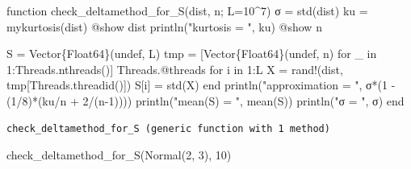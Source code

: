\documentclass[
  letterpaper,
  DIV=11,
  numbers=noendperiod]{scrartcl}
\newenvironment{Shaded}{\begin{snugshade}}{\end{snugshade}}
\newcommand{\BuiltInTok}[1]{\textcolor[rgb]{0.00,0.23,0.31}{#1}}
\newcommand{\ConstantTok}[1]{\textcolor[rgb]{0.56,0.35,0.01}{#1}}
\newcommand{\ControlFlowTok}[1]{\textcolor[rgb]{0.00,0.23,0.31}{#1}}
\newcommand{\DataTypeTok}[1]{\textcolor[rgb]{0.68,0.00,0.00}{#1}}
\newcommand{\FloatTok}[1]{\textcolor[rgb]{0.68,0.00,0.00}{#1}}
\newcommand{\FunctionTok}[1]{\textcolor[rgb]{0.28,0.35,0.67}{#1}}
\newcommand{\KeywordTok}[1]{\textcolor[rgb]{0.00,0.23,0.31}{#1}}
\newcommand{\NormalTok}[1]{\textcolor[rgb]{0.00,0.23,0.31}{#1}}
\newcommand{\OperatorTok}[1]{\textcolor[rgb]{0.37,0.37,0.37}{#1}}
\newcommand{\PreprocessorTok}[1]{\textcolor[rgb]{0.68,0.00,0.00}{#1}}
\newcommand{\StringTok}[1]{\textcolor[rgb]{0.13,0.47,0.30}{#1}}
\begin{document}
\begin{Shaded}
\begin{Highlighting}[]
\KeywordTok{function} \FunctionTok{check\_deltamethod\_for\_S}\NormalTok{(dist, n; L}\OperatorTok{=}\FloatTok{10}\OperatorTok{\^{}}\FloatTok{7}\NormalTok{)}
\NormalTok{    σ }\OperatorTok{=} \FunctionTok{std}\NormalTok{(dist)}
\NormalTok{    ku }\OperatorTok{=} \FunctionTok{mykurtosis}\NormalTok{(dist)}
    \PreprocessorTok{@show}\NormalTok{ dist}
    \FunctionTok{println}\NormalTok{(}\StringTok{"kurtosis = "}\NormalTok{, ku)}
    \PreprocessorTok{@show}\NormalTok{ n}
    
\NormalTok{    S }\OperatorTok{=} \FunctionTok{Vector}\DataTypeTok{\{Float64\}}\NormalTok{(}\ConstantTok{undef}\NormalTok{, L)}
\NormalTok{    tmp }\OperatorTok{=}\NormalTok{ [}\FunctionTok{Vector}\DataTypeTok{\{Float64\}}\NormalTok{(}\ConstantTok{undef}\NormalTok{, n) for \_ }\KeywordTok{in} \FloatTok{1}\OperatorTok{:}\BuiltInTok{Threads}\NormalTok{.}\FunctionTok{nthreads}\NormalTok{()]}
    \BuiltInTok{Threads}\NormalTok{.}\PreprocessorTok{@threads} \ControlFlowTok{for}\NormalTok{ i }\KeywordTok{in} \FloatTok{1}\OperatorTok{:}\NormalTok{L}
\NormalTok{        X }\OperatorTok{=} \FunctionTok{rand!}\NormalTok{(dist, tmp[}\BuiltInTok{Threads}\NormalTok{.}\FunctionTok{threadid}\NormalTok{()])}
\NormalTok{        S[i] }\OperatorTok{=} \FunctionTok{std}\NormalTok{(X)}
    \ControlFlowTok{end}
    \FunctionTok{println}\NormalTok{(}\StringTok{"approximation = "}\NormalTok{, }\FunctionTok{σ*}\NormalTok{(}\FloatTok{1} \OperatorTok{{-}}\NormalTok{ (}\FloatTok{1}\OperatorTok{/}\FloatTok{8}\NormalTok{)}\FunctionTok{*}\NormalTok{(ku}\OperatorTok{/}\NormalTok{n }\OperatorTok{+} \FloatTok{2}\OperatorTok{/}\NormalTok{(n}\OperatorTok{{-}}\FloatTok{1}\NormalTok{))))}
    \FunctionTok{println}\NormalTok{(}\StringTok{"mean(S) =       "}\NormalTok{, }\FunctionTok{mean}\NormalTok{(S))}
    \FunctionTok{println}\NormalTok{(}\StringTok{"σ =             "}\NormalTok{, σ)}
\KeywordTok{end}
\end{Highlighting}
\end{Shaded}

\begin{verbatim}
check_deltamethod_for_S (generic function with 1 method)
\end{verbatim}

\begin{Shaded}
\begin{Highlighting}[]
\FunctionTok{check\_deltamethod\_for\_S}\NormalTok{(}\FunctionTok{Normal}\NormalTok{(}\FloatTok{2}\NormalTok{, }\FloatTok{3}\NormalTok{), }\FloatTok{10}\NormalTok{)}
\end{Highlighting}
\end{Shaded}
\end{document}
